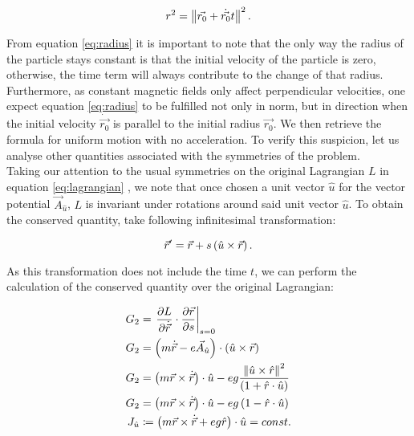 \begin{equation}
r^2 = \left\lVert \vec{r_0}+\dot{\vec{r_0}}t \right\rVert^2 .
\label{eq:radius}
\end{equation}

From equation \eqref{eq:radius} it is important to note that the only way the radius of the particle stays constant is that the initial velocity of the particle is zero, otherwise, the time term will always contribute to the change of that radius. Furthermore, as constant magnetic fields only affect perpendicular velocities, one expect equation \eqref{eq:radius} to be fulfilled not only in norm, but in direction when the initial velocity $\dot{\vec{r_0}}$ is parallel to the initial radius $\vec{r_0}$. We then retrieve the formula for uniform motion with no acceleration. To verify this suspicion, let us analyse other quantities associated with the symmetries of the problem.\\

Taking our attention to the usual symmetries on the original Lagrangian $L$ in equation \eqref{eq:lagrangian} , we note that once chosen a unit vector $\hat{u}$ for the vector potential  $\vec{A}_{\hat{u}}$, $L$ is invariant under rotations around said unit vector $\hat{u}$. To obtain the conserved quantity, take following infinitesimal transformation:

\begin{equation}
\vec{r}' = \vec{r} + s\left( \hat{u}\times\vec{r} \right).
\label{eq:rotinv}
\end{equation}

As this transformation does not include the time $t$, we can perform the calculation of the conserved quantity over the original Lagrangian:

\begin{align*}
G_2 &= \left. \frac{\partial L}{\partial \dot{\vec{r}}}\cdot\frac{\partial \vec{r}}{\partial s} \right|_{s=0}\\
G_2 &= \left( m\dot{\vec{r}} - e\vec{A}_{\hat{u}} \right)\cdot \left( \hat{u}\times\vec{r} \right) \\
G_2 &= \left( m\vec{r}\times\dot{\vec{r}} \right)\cdot\hat{u}-eg\frac{\left\lVert \hat{u}\times\hat{r} \right\rVert^2}{\left( 1+\hat{r}\cdot\hat{u} \right)}\\
G_2 &= \left( m\vec{r}\times\dot{\vec{r}} \right)\cdot\hat{u} -eg\left( 1-\hat{r}\cdot\hat{u} \right)\\
J_{\hat{u}} &\coloneqq \left( {m\vec{r}\times\dot{\vec{r}}}+ eg\hat{r} \right)\cdot\hat{u} = const.
\end{align*}


